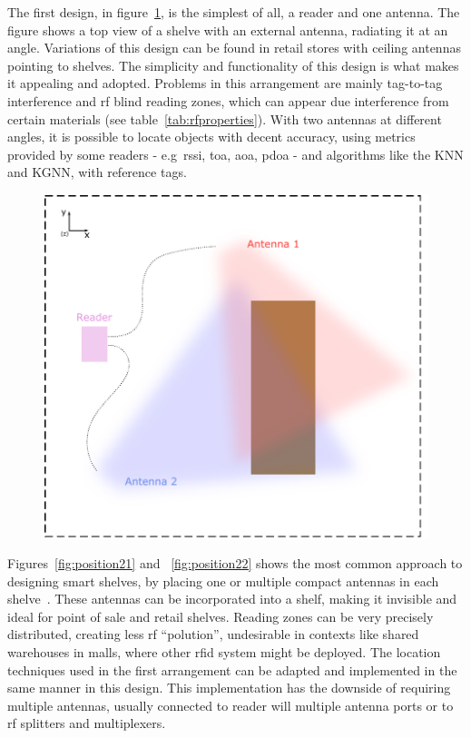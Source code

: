 The first design, in figure~\ref{fig:position1}, is the simplest of all, a reader and one antenna. The figure shows a top view of a shelve with an external antenna, radiating it at an angle. Variations of this design can be found in retail stores with ceiling antennas pointing to shelves.
The simplicity and functionality of this design is what makes it appealing and adopted.
Problems in this arrangement are mainly  tag-to-tag interference and \ac{rf} blind reading zones, which can appear due interference from certain materials (see table~\ref{tab:rfproperties}).
With two antennas at different angles, it is possible to locate objects with decent accuracy, using metrics provided by some readers - e.g\ \ac{rssi}, \ac{toa}, \ac{aoa}, \ac{pdoa} - and algorithms like the KNN and KGNN, with reference tags.

\begin{figure}[H]
    \centering
    \includegraphics[width=0.5\linewidth]{./figs/02-state-of-the-art/position1.pdf}
    \caption{} 
    \label{fig:position1}
\end{figure}

Figures~\ref{fig:position21} and ~\ref{fig:position22} shows the most common approach to designing smart shelves, by placing one or multiple compact antennas in each shelve~\cite{markakisSafeEfficientDesign2014}.
These antennas can be incorporated into a shelf, making it invisible and ideal for point of sale and retail shelves.
Reading zones can be very precisely distributed, creating less \ac{rf} ``polution'', undesirable in contexts like shared warehouses in malls, where other \ac{rfid} system might be deployed.
The location techniques used in the first arrangement can be adapted and implemented in the same manner in this design.
This implementation has the downside of requiring multiple antennas, usually connected to reader will multiple antenna ports or to \ac{rf} splitters and multiplexers.

